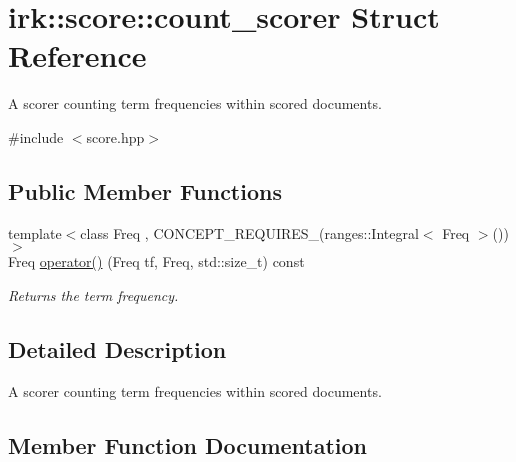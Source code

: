 \hypertarget{structirk_1_1score_1_1count__scorer}{}\section{irk\+:\+:score\+:\+:count\+\_\+scorer Struct Reference}
\label{structirk_1_1score_1_1count__scorer}


A scorer counting term frequencies within scored documents.  




{\ttfamily \#include $<$score.\+hpp$>$}

\subsection*{Public Member Functions}
\begin{DoxyCompactItemize}
\item 
{\footnotesize template$<$class Freq , C\+O\+N\+C\+E\+P\+T\+\_\+\+R\+E\+Q\+U\+I\+R\+E\+S\+\_\+(ranges\+::\+Integral$<$ Freq $>$()) $>$ }\\Freq \mbox{\hyperlink{structirk_1_1score_1_1count__scorer_ab326833858c906a4c9b17d7ace99024f}{operator()}} (Freq tf, Freq, std\+::size\+\_\+t) const
\begin{DoxyCompactList}\small\item\em Returns the term frequency. \end{DoxyCompactList}\end{DoxyCompactItemize}


\subsection{Detailed Description}
A scorer counting term frequencies within scored documents. 

\subsection{Member Function Documentation}
\mbox{\label{structirk_1_1score_1_1count__scorer_ab326833858c906a4c9b17d7ace99024f}} 
